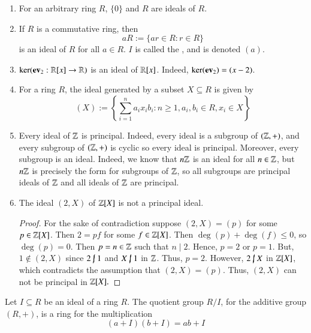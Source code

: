 \begin{example}
    \leavevmode
    \begin{enumerate}
        \item For an arbitrary ring $R$, $\{0\}$ and $R$ are ideals of $R$.
        \item If $R$ is a commutative ring, then \begin{equation}
            aR := \{ar \in R: r \in R\}
        \end{equation}
        is an ideal of $R$ for all $a \in R$. $I$ is called the , and is denoted $(a)$.
        \item $\ker(\operatorname{\bf{ev}}_2:\mathbb R[x]\rightarrow \mathbb R)$ is an ideal of $\mathbb R[x]$. Indeed, $\ker(\operatorname{\bf{ev}}_2) = (x-2)$.
        \item For a ring $R$, the ideal generated by a subset $X \subseteq R$ is given by \begin{equation}
            (X) := \left\{\sum\limits_{i=1}^na_ix_ib_i: n \geq 1, a_i,b_i \in R, x_i \in X\right\}
        \end{equation}
        \item Every ideal of $\mathbb Z$ is principal. Indeed, every ideal is a subgroup of $(\mathbb Z,+)$, and every subgroup of $(\mathbb Z,+)$ is cyclic so every ideal is principal. Moreover, every subgroup is an ideal. Indeed, we know that $n\mathbb Z$ is an ideal for all $n \in \mathbb Z$, but $n\mathbb Z$ is precisely the form for subgroups of $\mathbb Z$, so all subgroups are principal ideals of $\mathbb Z$ and all ideals of $\mathbb Z$ are principal.
        \item The ideal $(2,X)$ of $\mathbb Z[X]$ is not a principal ideal.
        \begin{proof}
            For the sake of contradiction suppose $(2,X) = (p)$ for some $p \in \mathbb Z[X]$. Then $2 = pf$ for some $f \in \mathbb Z[X]$. Then $\deg(p) + \deg(f) \leq 0$, so $\deg(p) = 0$. Then $p = n \in \mathbb Z$ such that $n\;\vert\;2$. Hence, $p = 2$ or $p = 1$. But, $1 \notin (2,X)$ since $2 \;\cancel{\vert}\;1$ and $X\;\cancel{\vert}\;1$ in $\mathbb Z$. Thus, $p = 2$. However, $2\;\cancel{\vert}\;X$ in $\mathbb Z[X]$, which contradicts the assumption that $(2,X) = (p)$. Thus, $(2,X)$ can not be principal in $\mathbb Z[X].$
        \end{proof}
    \end{enumerate}
\end{example}


\begin{definition}
    Let $I \subseteq R$ be an ideal of a ring $R$. The quotient group $R/I$, for the additive group $(R,+)$, is a ring for the multiplication \begin{equation}
        (a+I)(b+I) = ab+I \tag{$\star$}\label{eq:quot_ring}
    \end{equation}
\end{definition}

